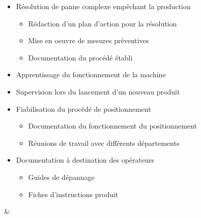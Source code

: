 \documentclass{article}
\begin{document}
\begin{tabular}
\begin{itemize}
\begin{itemize}
            \item \textcolor{gray!100}{Résolution de panne complexe empêchant la production}
            \begin{itemize}
                [label={\textcolor{gray!100}{$\triangleright$}}, topsep=0pt, partopsep=0pt, itemsep=0.5pt, parsep=2pt]
                \item \textcolor{gray!100}{Rédaction d'un plan d'action pour la résolution}
                \item \textcolor{gray!100}{Mise en oeuvre de mesures préventives}
                \item \textcolor{gray!100}{Documentation du procédé établi}
            \end{itemize}
            \item \textcolor{gray!100}{Apprentissage du fonctionnement de la machine}
            \item \textcolor{gray!100}{Supervision lors du lancement d'un nouveau produit}
            \item \textcolor{gray!100}{Fiabilisation du procédé de positionnement}
            \begin{itemize}
                [label={\textcolor{gray!100}{$\triangleright$}}, topsep=0pt, partopsep=0pt, itemsep=0.5pt, parsep=2pt]
                \item \textcolor{gray!100}{Documentation du fonctionnement du positionnement}
                \item \textcolor{gray!100}{Réunions de travail avec différents départements}
            \end{itemize}
            \item \textcolor{gray!100}{Documentation à destination des opérateurs}
            \begin{itemize}
            [label={\textcolor{gray!100}{$\triangleright$}}, topsep=0pt, partopsep=0pt, itemsep=0.5pt, parsep=2pt]
                \item \textcolor{gray!100}{Guides de dépannage}
                \item \textcolor{gray!100}{Fiches d'instructions produit}
            \end{itemize}
        \end{itemize}
    \end{itemize}
    &
    \begin{itemize}
        [label={}, topsep=8pt, partopsep=0pt, itemsep=0.5pt, parsep=2pt,after=\vspace*{-\baselineskip}]
        \setlength{\itemsep}{10pt}

\end{itemize}
\end{tabular}
\end{document}
